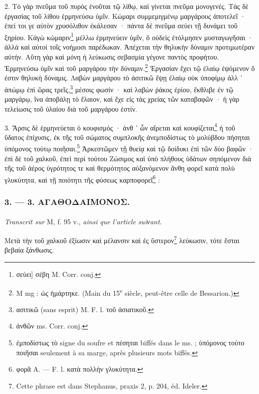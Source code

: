 \documentclass[a4paper, 11pt, oneside, polutonikogreek, french]{article}
\begin{document}
2. Τὸ γὰρ πνεῦμα τοῦ πυρὸς ἑνοῦται τῷ λίθῳ, καὶ γίνεται πνεῦμα μονογενές. Τὰς δὲ ἐργασίας τοῦ λίθου ἑρμηνεύσω ὑμῖν. Κώμαρι συμμεμιγμένῳ μαργάρους ἀποτελεῖ · ἐπεί τοι γε αὐτὸν χρυσόλιθον ἐκάλεσαν · πάντα δὲ πνεῦμα σεύει τῇ δυνάμει τοῦ ξηρίου. Κἀγὼ κώμαριν\footnote{σεύει] σέβη M. Corr. conj.} μέλλω ἑρμηνεύειν ὑμῖν, ὃ οὐδεὶς ἐτόλμησεν μυσταγωγῆσαι · ἀλλὰ καὶ αὐτοὶ τοῖς νοήμοσι παρέδωκαν. Ἀπέχεται τὴν θηλυκὴν δύναμιν προτιμωτέραν αὐτήν. Αὕτη γὰρ καὶ μόνη ἡ λεύκωσις σεβασμία γέγονε παντὸς προφήτου. Ἑρμηνεύσω ὑμῖν καὶ τοῦ μαργάρου τὴν δύναμιν.\footnote{M mg : ὡς ἡμάρτηκε. (Main du 15\textsuperscript{e} siècle, peut-être celle de Bessarion.)} Ἐργασίαν ἔχει τῷ ἐλαίῳ ἑψόμενον ὅ ἐστιν θηλυκὴ δύναμις. Λαβὼν μαργάρου τὸ ἀσιτικῶ ἕψῃ ἐλαίῳ οὐκ ὑποφίμῳ ἀλλ ᾽ ἀπώμῳ ἐπὶ ὥρας τρεῖς,\footnote{ασιτικῶ (sans esprit) M. F. l. τοῦ ἀσιατικοῦ.} μέσοις φωσίν · καὶ λαβὼν ῥάκος ἐρίου, ἔκθλιβε ἐν τῷ μαργάρῳ, ἵνα ἀποβάλῃ τὸ ἔλαιον, καὶ ἔχε εἰς τὰς χρείας τῶν καταβαφῶν · ἡ γὰρ τελείωσις τοῦ ὑλαίου διὰ τοῦ μαργάρου ἐστίν.

3. Ἄρσις δὲ ἑρμηνεύεται ὁ κουφισμός · ἀνθ ᾽ ὧν αἴρεται καὶ κουφίζεται\footnote{ἀνθῶν ms. Corr. conj.} ἡ τοῦ ὕδατος ἐπίχυσις, ἐκ τῆς τοῦ σώματος συμπλοκῆς ἀνεμποδίστως τὸ μολύβδου πήσηται ὑπόμονος τούτῳ ποιῆσαι.\footnote{ἐμποδίστως τὸ signe du soufre et πέσηται biffés dans le ms. ; ὑπόμονος τούτο ποιῆσαι seulement à sa marge, après plusieurs mots biffés.} Ἀρκεστῶμεν τῇ θυείᾳ καὶ τῷ δοίδυκι ἐπὶ τῶν δύο βαφῶν · ἐπὶ δὲ τοῦ χαλκοῦ, ἐπεὶ περὶ τούτου Ζώσιμος καὶ ὑπὸ πλήθους ὑδάτων σηπόμενον διὰ τῆς τοῦ ἀέρος ὑγρότητος τε καὶ θερμότητος αὐξανόμενον ἄνθη φορεῖ κατὰ πολὺ γλυκύτητα, καὶ τῇ ποιότητι τῆς φύσεως καρποφορεῖ\footnote{φορᾶ A. --- F. l. κατὰ πολλὴν γλυκύτητα.} :

\bigskip
\centerline{\EightStarTaper}
\centerline{\EightStarTaper\EightStarTaper}
\bigskip

\subsubsection{3. --- 3. ΑΓΑΘΟΔΑΙΜΟΝΟΣ.}
\paragraph{}
\emph{Transcrit sur} M, f. 95 v., \emph{ainsi que l'article suiνant}.

\bigskip

Μετὰ τὴν τοῦ χαλκοῦ ἐξίωσιν καὶ μέλανσιν καὶ ἐς ὕστερον\footnote{Cette phrase est dans Stephanus, praxis 2, p. 204, éd. Ideler.} λεύκωσιν, τότε ἔσται βεβαία ξάνθωσις.
\end{document}
